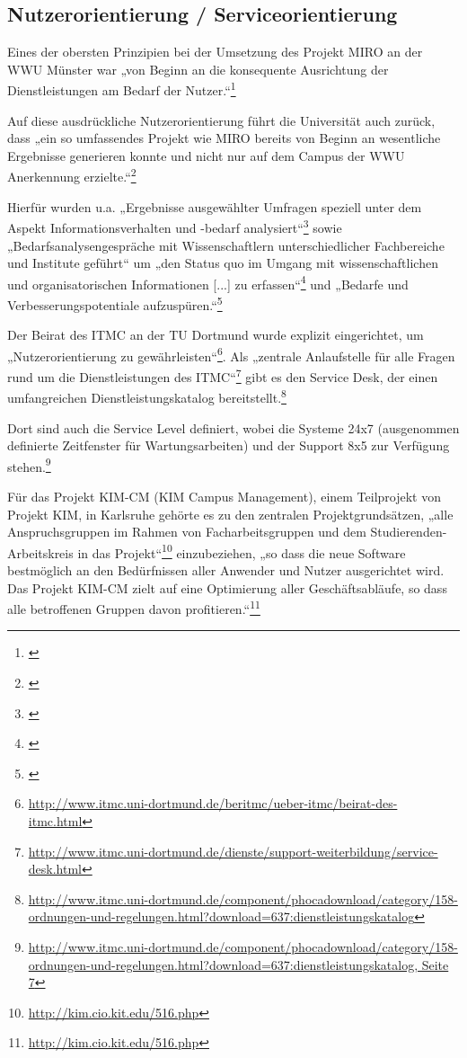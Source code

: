 \subsection{Nutzerorientierung / Serviceorientierung}
Eines der obersten Prinzipien bei der Umsetzung des Projekt MIRO an der WWU Münster war „von Beginn an die konsequente Ausrichtung der Dienstleistungen am Bedarf der Nutzer.“\footnote{\cite[19]{vogl_bericht_2013}}

Auf diese ausdrückliche Nutzerorientierung führt die Universität auch zurück, dass „ein so umfassendes Projekt wie MIRO bereits von Beginn an wesentliche Ergebnisse generieren konnte und nicht nur auf dem Campus der WWU Anerkennung erzielte.“\footnote{\cite[19]{vogl_bericht_2013}}

Hierfür wurden u.a. „Ergebnisse ausgewählter Umfragen speziell unter dem Aspekt Informationsverhalten und -bedarf analysiert“\footnote{\cite[19]{vogl_bericht_2013}} sowie „Bedarfsanalysengespräche mit Wissenschaftlern unterschiedlicher Fachbereiche und Institute geführt“ um „den Status quo im Umgang mit wissenschaftlichen und organisatorischen Informationen [...] zu erfassen“\footnote{\cite[19]{vogl_bericht_2013}} und „Bedarfe und Verbesserungspotentiale aufzuspüren.“\footnote{\cite[20]{vogl_bericht_2013}}

Der Beirat des ITMC an der TU Dortmund wurde explizit eingerichtet, um „Nutzerorientierung zu 
gewährleisten“\footnote{\url{http://www.itmc.uni-dortmund.de/beritmc/ueber-itmc/beirat-des-itmc.html}}. Als „zentrale Anlaufstelle für alle Fragen 
rund um die Dienstleistungen des ITMC“\footnote{\url{http://www.itmc.uni-dortmund.de/dienste/support-weiterbildung/service-desk.html}} gibt es 
den Service Desk, der einen umfangreichen Dienstleistungskatalog 
bereitstellt.\footnote{\url{http://www.itmc.uni-dortmund.de/component/phocadownload/category/158-ordnungen-und-regelungen.html?download=637:dienstleistungskatalog}}

Dort sind auch die Service Level definiert, wobei  die Systeme 24x7 (ausgenommen definierte Zeitfenster für Wartungsarbeiten) und der Support 8x5 zur 
Verfügung 
stehen.\footnote{\url{http://www.itmc.uni-dortmund.de/component/phocadownload/category/158-ordnungen-und-regelungen.html?download=637:dienstleistungskatalog, Seite 7}}

Für das Projekt KIM-CM (KIM Campus Management), einem Teilprojekt von Projekt KIM, in Karlsruhe gehörte es zu den zentralen Projektgrundsätzen, „alle Anspruchsgruppen im Rahmen von Facharbeitsgruppen und dem Studierenden-Arbeitskreis in das Projekt“\footnote{\url{http://kim.cio.kit.edu/516.php}} einzubeziehen, „so dass die neue Software bestmöglich an den Bedürfnissen aller Anwender und Nutzer ausgerichtet wird. Das Projekt KIM-CM zielt auf eine Optimierung aller Geschäftsabläufe, so dass alle betroffenen Gruppen davon profitieren.“\footnote{\url{http://kim.cio.kit.edu/516.php}}

